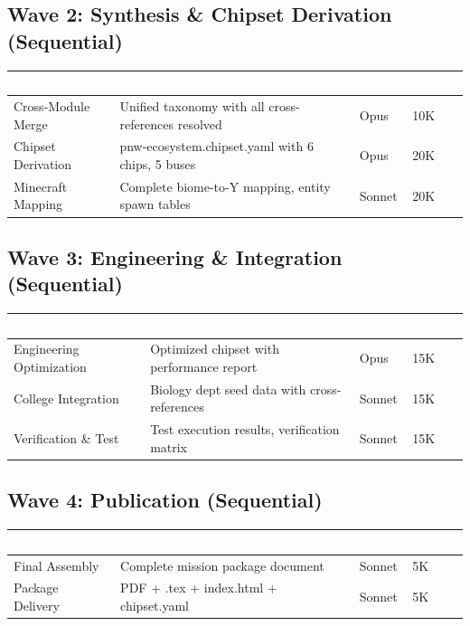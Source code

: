 \documentclass[11pt,letterpaper]{article}
\newcommand{\tableheader}[1]{\textbf{\sffamily\textcolor{white}{#1}}}
\begin{document}
\subsection{Wave 2: Synthesis \& Chipset Derivation (Sequential)}

\begin{center}
\begin{tabularx}{\textwidth}{L{3cm}XC{1.5cm}C{1.5cm}}
\toprule
{}
\tableheader{Task} & \tableheader{Produces} & \tableheader{Model} & \tableheader{Tokens} \\
\midrule
Cross-Module Merge & Unified taxonomy with all cross-references resolved & Opus & 10K \\
Chipset Derivation & pnw-ecosystem.chipset.yaml with 6 chips, 5 buses & Opus & 20K \\
Minecraft Mapping & Complete biome-to-Y mapping, entity spawn tables & Sonnet & 20K \\
\bottomrule
\end{tabularx}
\end{center}

\subsection{Wave 3: Engineering \& Integration (Sequential)}

\begin{center}
\begin{tabularx}{\textwidth}{L{3cm}XC{1.5cm}C{1.5cm}}
\toprule
{}
\tableheader{Task} & \tableheader{Produces} & \tableheader{Model} & \tableheader{Tokens} \\
\midrule
Engineering Optimization & Optimized chipset with performance report & Opus & 15K \\
College Integration & Biology dept seed data with cross-references & Sonnet & 15K \\
Verification \& Test & Test execution results, verification matrix & Sonnet & 15K \\
\bottomrule
\end{tabularx}
\end{center}

\subsection{Wave 4: Publication (Sequential)}

\begin{center}
\begin{tabularx}{\textwidth}{L{3cm}XC{1.5cm}C{1.5cm}}
\toprule
{}
\tableheader{Task} & \tableheader{Produces} & \tableheader{Model} & \tableheader{Tokens} \\
\midrule
Final Assembly & Complete mission package document & Sonnet & 5K \\
Package Delivery & PDF + .tex + index.html + chipset.yaml & Sonnet & 5K \\
\bottomrule
\end{tabularx}
\end{center}
\end{document}
